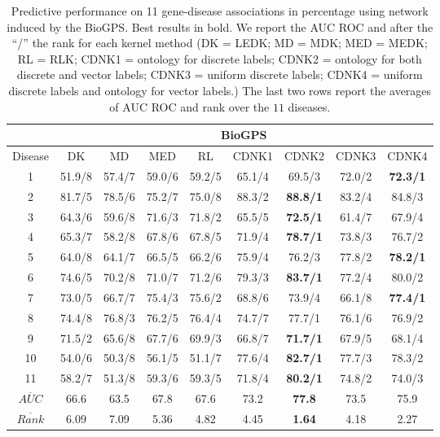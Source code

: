 \documentclass[review]{elsarticle}
\begin{document}
\begin{table}[h]
\caption{Predictive performance on 11 gene-disease associations in percentage using network induced by the BioGPS. Best results in bold. We report the AUC ROC and after the ``/'' the rank for each kernel method (DK = LEDK; MD = MDK; MED = MEDK; RL = RLK; CDNK1 = ontology for discrete labels; CDNK2 = ontology for both discrete and vector labels; CDNK3 = uniform discrete labels;  CDNK4 = uniform discrete labels and ontology for vector labels.) The last two rows report the averages of AUC ROC and rank over the $11$ diseases.} \vspace{1em}
\centering
\setlength{\tabcolsep}{1mm}
\begin{tabular}{|c|c|c|c|c|c|c|c|c|}
\hline
         & \multicolumn{8}{c|}{\textbf{BioGPS}}\\
 \hline
Disease & DK & MD & MED & RL & CDNK1 & CDNK2 & CDNK3 & CDNK4\\

 \hline
1 & 51.9/8 & 57.4/7 & 59.0/6 & 59.2/5 & 65.1/4 & 69.5/3 & 72.0/2 & \textbf{72.3/1} \\

2 & 81.7/5 & 78.5/6 & 75.2/7 & 75.0/8 & 88.3/2 & \textbf{88.8/1} & 83.2/4 & 84.8/3 \\

3 & 64.3/6 & 59.6/8 & 71.6/3 & 71.8/2 & 65.5/5 & \textbf{72.5/1} & 61.4/7 & 67.9/4 \\

4 & 65.3/7 & 58.2/8 & 67.8/6 & 67.8/5 & 71.9/4 & \textbf{78.7/1} & 73.8/3 & 76.7/2 \\

5 & 64.0/8 & 64.1/7 & 66.5/5 & 66.2/6 & 75.9/4 & 76.2/3 & 77.8/2 & \textbf{78.2/1} \\

6 & 74.6/5 & 70.2/8 & 71.0/7 & 71.2/6 & 79.3/3 & \textbf{83.7/1} & 77.2/4 & 80.0/2 \\

7 & 73.0/5 & 66.7/7 & 75.4/3 & 75.6/2 & 68.8/6 & 73.9/4 & 66.1/8 & \textbf{77.4/1} \\

8 & 74.4/8 & 76.8/3 & 76.2/5 & 76.4/4 & 74.7/7 & 77.7/1 & 76.1/6 & 76.9/2 \\

9 & 71.5/2 & 65.6/8 & 67.7/6 & 69.9/3 & 66.8/7 & \textbf{71.7/1} & 67.9/5 & 68.1/4 \\

10 & 54.0/6 & 50.3/8 & 56.1/5 & 51.1/7 & 77.6/4 & \textbf{82.7/1} & 77.7/3 & 78.3/2 \\

11 & 58.2/7 & 51.3/8 & 59.3/6 & 59.3/5 & 71.8/4 & \textbf{80.2/1} & 74.8/2 & 74.0/3 \\

\hline
$\overline{AUC}$ & 66.6	& 63.5 & 67.8 &	67.6 & 73.2 & \textbf{77.8} & 73.5 & 75.9 \\


$\overline{Rank}$ & 6.09 & 7.09 &  5.36 & 4.82 & 4.45 & \textbf{1.64} & 4.18 & 2.27 \\
 \hline 
\end{tabular}
\label{tab:cdnk-biogps}
\end{table}
\end{document}
